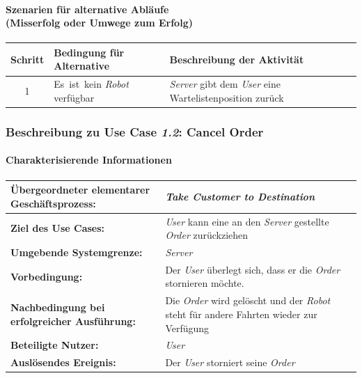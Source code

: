 			\paragraph*{Szenarien für alternative Abläufe\\ (Misserfolg oder Umwege zum Erfolg)}	
					
			\begin{table}[H]
					\centering
					\begin{tabularx}{\textwidth}{|c|p{2cm}|X|}
					\hline
					Schritt & Bedingung für Alternative & Beschreibung der Aktivität \\ \hline
					1 & \mbox{Es ist kein} \emph{Robot} verfügbar & \emph{Server} gibt dem \emph{User} eine Wartelistenposition zurück \\
					\hline
					\end{tabularx}
				\end{table}
				
				
			\pagebreak
			
			\subsubsection{Beschreibung zu Use Case \emph{1.2}: Cancel Order}
			\paragraph*{Charakterisierende Informationen}
			
			\begin{table}[H]
				\centering
				\begin{tabularx}{\textwidth}{|p{5cm}|X|}
					\hline
					\textbf{Übergeordneter elementarer Geschäftsprozess:} & \emph{Take Customer to Destination} \\ \hline
					\textbf{Ziel des Use Cases:} & \emph{User} kann eine an den \emph{Server} gestellte \emph{Order} zurückziehen \\ \hline
					\textbf{Umgebende Systemgrenze:} & \emph{Server} \\ \hline
					\textbf{Vorbedingung:} & Der \emph{User} überlegt sich, dass er die \emph{Order} stornieren möchte. \\ \hline
					\textbf{Nachbedingung bei erfolgreicher Ausführung:} & Die \emph{Order} wird gelöscht und der \emph{Robot} steht für andere Fahrten wieder zur Verfügung \\ \hline
					\textbf{Beteiligte Nutzer:} & \emph{User} \\ \hline
					\textbf{Auslösendes Ereignis:} & Der \emph{User} storniert seine \emph{Order} \\
					\hline
				\end{tabularx}
			\end{table}
			

